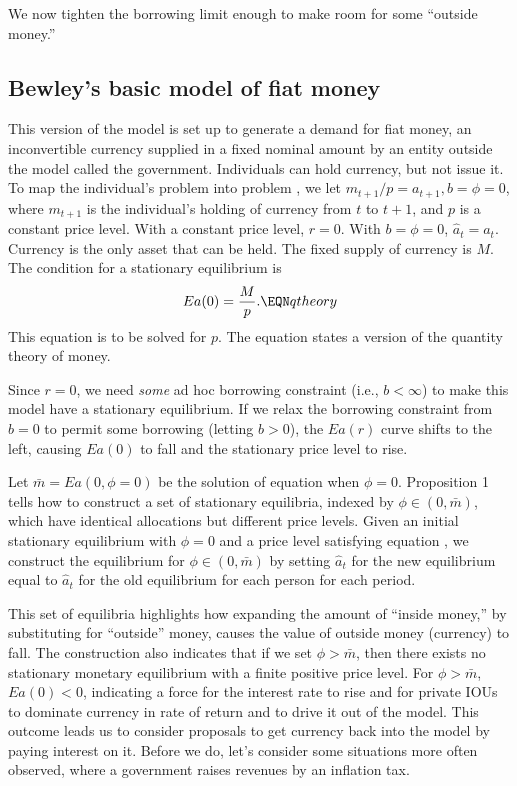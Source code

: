 We now tighten the borrowing limit enough to make
room for  some ``outside money.''

\subsection{Bewley's basic model of fiat money}
   This version of the  model is set up to generate a demand for fiat money,
an inconvertible currency  supplied in a fixed nominal
amount by  an
entity outside the model called the government.  Individuals can hold currency,
but not issue it.  To map the individual's problem into
problem ,
we let $m_{t+1} / p = a_{t+1} , b= \phi =0$, where $m_{t+1}$
is the individual's holding of currency from $t$ to $t+1$,
and $p$ is a constant price level. With a constant price
level, $r=0$.   With $b=\phi=0$,
$\hat a_t = a_t$. Currency is the only
asset that can   be held.   The fixed supply of currency is $M$.
The condition for a stationary  equilibrium
is
$$ E a(0) = { M   \over p}. \EQN qtheory  $$
This equation is to be solved for $p$.  The equation states
a version of the  quantity theory of money.

  Since $r=0$, we need {\it some\/} ad hoc borrowing constraint
(i.e., $b < \infty$)
to make this model have a stationary equilibrium.
    If we relax the borrowing constraint from $b=0$ to permit
some borrowing (letting $b > 0$), the $E a(r) $ curve
shifts to the left, causing  $E a(0)$ to fall
and  the stationary price level to rise.

Let $ \bar m = E a(0, \phi=0)$ be the solution of equation
 when $\phi =0$.    Proposition
1 tells how to construct a set of stationary equilibria,
indexed  by $\phi \in (0, \bar m)$, which
have identical allocations but different price levels.
Given an initial stationary equilibrium with $\phi =0$ and a price
level satisfying equation , we construct the  equilibrium
for $\phi \in (0, \bar m)$ by
setting  $\hat a_t $ for the new equilibrium equal to $\hat a_t$ for
the old equilibrium for each person for each period.

       This set of equilibria
highlights how  expanding the amount
of ``inside money,'' by substituting for ``outside'' money,
causes the value of outside money (currency) to fall.
The construction also indicates that if we set $\phi > \bar m$,
then there exists no stationary monetary equilibrium with
a finite positive price level.
For $\phi > \bar m$,  $E a(0) < 0$, indicating
a force for the interest rate to rise and for
private IOUs to dominate currency in rate of return and to
drive it out of the model.
 This outcome leads us to consider proposals to get currency
back into the model by paying
interest on it.   Before we do, let's consider some situations
more often observed, where a government raises revenues
by an inflation tax.




